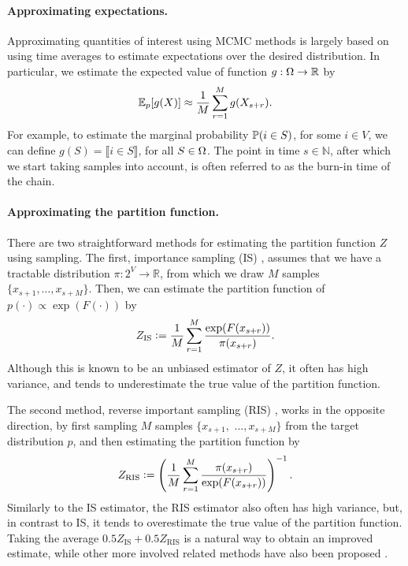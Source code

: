 \paragraph{Approximating expectations.}
Approximating quantities of interest using MCMC methods is largely based on using time averages to estimate expectations over the desired distribution.
In particular, we estimate the expected value of function $g : \ss \to \mathbb{R}$ by
\begin{align} \label{eq:exp_approx}
\E_p[g(X)] \approx \frac{1}{M}\sum_{r=1}^{M} g(X_{s + r}).
\end{align}
For example, to estimate the marginal probability $\P(i \in S)$, for some $i \in V$, we can define $g(S) = \llbracket i \in S \rrbracket$, for all $S \in \ss$.
The point in time $s \in \mathbb{N}$, after which we start taking samples into account, is often referred to as the burn-in time of the chain.

\paragraph{Approximating the partition function.}
There are two straightforward methods for estimating the partition function $Z$ using sampling.
The first, importance sampling (IS) \citep{ais}, assumes that we have a tractable distribution $\pi : 2^V \to \mathbb{R}$, from which we draw $M$ samples $\{x_{s+1}, \ldots, x_{s+M}\}$.
Then, we can estimate the partition function of $p(\cdot) \propto \exp(F(\cdot))$ by
\begin{align} \label{eq:is}
Z_{\textrm{IS}} \defeq \frac{1}{M} \sum_{r = 1}^{M} \frac{\exp(F(x_{s+r}))}{\pi(x_{s+r})}.
\end{align}
Although this is known to be an unbiased estimator of $Z$, it often has high variance, and tends to underestimate the true value of the partition function.

The second method, reverse important sampling (RIS) \citep{ris}, works in the opposite direction, by first sampling $M$ samples $\{x_{s+1},$ $\ldots, x_{s+M}\}$ from the target distribution $p$, and then estimating the partition function by
\begin{align} \label{eq:ris}
Z_{\textrm{RIS}} \defeq \left(\frac{1}{M} \sum_{r = 1}^{M} \frac{\pi(x_{s+r})}{\exp(F(x_{s+r}))}\right)^{-1}.
\end{align}
Similarly to the IS estimator, the RIS estimator also often has high variance, but, in contrast to IS, it tends to overestimate the true value of the partition function.
Taking the average $0.5 Z_{\textrm{IS}} + 0.5 Z_{\textrm{RIS}}$ is a natural way to obtain an improved estimate, while other more involved related methods have also been proposed \citep{burda15,liu15}.

